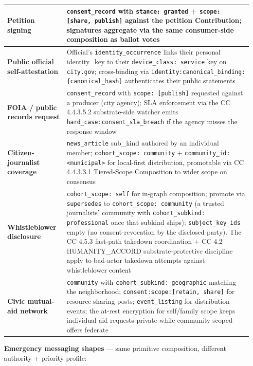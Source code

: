 \documentclass[11pt]{article}
\begin{document}
{\begin{longtable}{|p{8.0cm}|p{8.0cm}|}
\textbf{Petition signing} & \texttt{consent\_record} with \texttt{stance: granted} + \texttt{scope: [share, publish]} against the petition Contribution; signatures aggregate via the same consumer-side composition as ballot votes \\ \hline
\textbf{Public official self-attestation} & Official's \texttt{identity\_occurrence} links their personal identity\_key to their \texttt{device\_class: service} key on \texttt{city.gov}; cross-binding via \texttt{identity:canonical\_binding:\{canonical\_hash\}} authenticates their public statements \\ \hline
\textbf{FOIA / public records request} & \texttt{consent\_record} with \texttt{scope: [publish]} requested against a producer (city agency); SLA enforcement via the CC 4.4.3.5.2 substrate-side watcher emits \texttt{hard\_case:consent\_sla\_breach} if the agency misses the response window \\ \hline
\textbf{Citizen-journalist coverage} & \texttt{news\_article} sub\_kind authored by an individual member; \texttt{cohort\_scope: community} + \texttt{community\_id: <municipal>} for local-first distribution, promotable via CC 4.4.3.3.1 Tiered-Scope Composition to wider scope on consensus \\ \hline
\textbf{Whistleblower disclosure} & \texttt{cohort\_scope: self} for in-graph composition; promote via \texttt{supersedes} to \texttt{cohort\_scope: community} (a trusted journalists' community with \texttt{cohort\_subkind: professional} once that subkind ships); \texttt{subject\_key\_ids} empty (no consent-revocation by the disclosed party). The CC 4.5.3 fast-path takedown coordination + CC 4.2 HUMANITY\_ACCORD substrate-protective discipline apply to bad-actor takedown attempts against whistleblower content \\ \hline
\textbf{Civic mutual-aid network} & \texttt{community} with \texttt{cohort\_subkind: geographic} matching the neighborhood; \texttt{consent:scope:[retain, share]} for resource-sharing posts; \texttt{event\_listing} for distribution events; the at-rest encryption for self/family scope keeps individual aid requests private while community-scoped offers federate \\ \hline
\end{longtable}}


\textbf{Emergency messaging shapes} — same primitive composition, different authority + priority profile:
\end{document}

